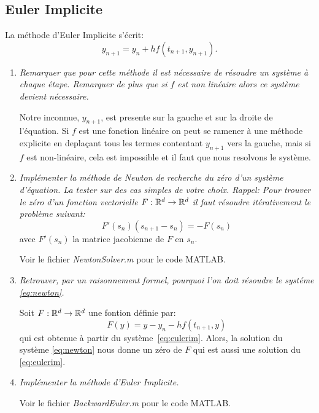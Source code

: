 \documentclass[a4paper,10pt]{article}
\begin{document}
\subsection{Euler Implicite}
La méthode d’Euler Implicite s’écrit:
\begin{equation}\label{eq:eulerim}
    y_{n + 1} = y_n + h f(t_{n + 1}, y_{n + 1}).
\end{equation}

\begin{enumerate}
    \item \emph{Remarquer que pour cette méthode il est nécessaire de résoudre un
    système à chaque étape. Remarquer de plus que si $f$ est non linéaire alors ce
    système devient nécessaire.}

    Notre inconnue, $y_{n + 1}$, est presente sur la gauche et sur la droite de
    l'équation. Si $f$ est une fonction linéaire on peut se ramener à une méthode
    explicite en deplaçant tous les termes contentant $y_{n + 1}$ vers la gauche,
    mais si $f$ est non-linéaire, cela est impossible et il faut que nous resolvons
    le système.

    \item \emph{Implémenter la méthode de Newton de recherche du zéro d’un système
    d’équation. La tester sur des cas simples de votre choix. Rappel: Pour trouver
    le zéro d'un fonction vectorielle $F: \mathbb{R}^d \to \mathbb{R}^d$ il faut
    résoudre itérativement le problème suivant:}
\begin{equation}\label{eq:newton}
    F'(s_n)(s_{n + 1} - s_n) = -F(s_n)
\end{equation}
avec $F'(s_n)$ la matrice jacobienne de $F$ en $s_n$.

    Voir le fichier \emph{NewtonSolver.m} pour le code MATLAB.

    \item \emph{Retrouver, par un raisonnement formel, pourquoi l'on doit résoudre le
    systéme \eqref{eq:newton}.}

    Soit $F: \mathbb{R}^d \to \mathbb{R}^d$ une fontion définie par:
\[
    F(y) = y - y_{n} - hf(t_{n + 1}, y)
\]
qui est obtenue à partir du système~\eqref{eq:eulerim}. Alors, la solution du système
\eqref{eq:newton} nous donne un zéro de $F$ qui est aussi une solution du
\eqref{eq:eulerim}.

    \item \emph{Implémenter la méthode d’Euler Implicite.}

    Voir le fichier \emph{BackwardEuler.m} pour le code MATLAB.


\end{enumerate}
\end{document}
